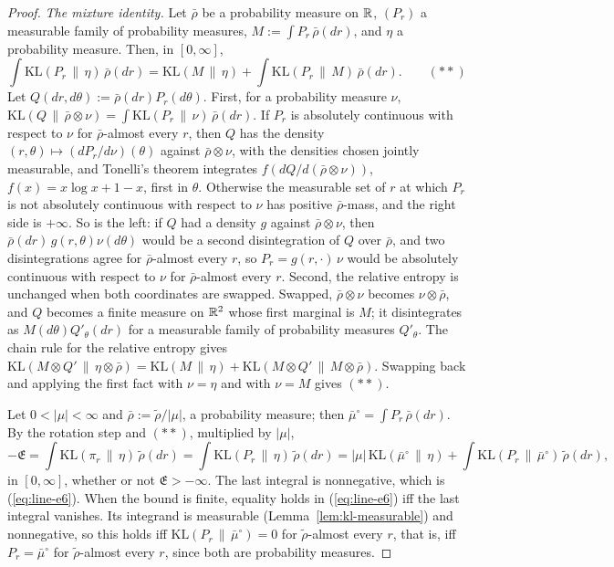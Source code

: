 \begin{proof}
\emph{The mixture identity.} Let $\bar\rho$ be a probability measure on $\mathbb{R}$, $(P_r)$ a measurable
family of probability measures, $M := \int P_r\,\bar\rho(dr)$, and $\eta$ a probability measure.
Then, in $[0,\infty]$,
\[
  \int\mathrm{KL}(P_r \,\|\, \eta)\,\bar\rho(dr)
  = \mathrm{KL}(M \,\|\, \eta) + \int\mathrm{KL}(P_r \,\|\, M)\,\bar\rho(dr). \qquad (**)
\]
Let $Q(dr, d\theta) := \bar\rho(dr)P_r(d\theta)$. First, for a probability measure $\nu$,
$\mathrm{KL}(Q \,\|\, \bar\rho \otimes \nu) = \int\mathrm{KL}(P_r \,\|\, \nu)\,\bar\rho(dr)$. If $P_r$
is absolutely continuous with respect to $\nu$ for $\bar\rho$-almost every $r$, then $Q$ has the
density $(r, \theta) \mapsto (dP_r/d\nu)(\theta)$ against $\bar\rho \otimes \nu$, with the densities
chosen jointly measurable, and Tonelli's theorem integrates $f(dQ/d(\bar\rho \otimes \nu))$,
$f(x) = x\log x + 1 - x$, first in $\theta$. Otherwise the measurable set of $r$ at which $P_r$ is
not absolutely continuous with respect to $\nu$ has positive $\bar\rho$-mass, and the right side is
$+\infty$. So is the left: if $Q$ had a density $g$ against $\bar\rho \otimes \nu$, then
$\bar\rho(dr)\,g(r, \theta)\nu(d\theta)$ would be a second disintegration of $Q$ over $\bar\rho$,
and two disintegrations agree for $\bar\rho$-almost every $r$, so $P_r = g(r, \cdot)\,\nu$ would be
absolutely continuous with respect to $\nu$ for $\bar\rho$-almost every $r$. Second, the relative entropy is
unchanged when both coordinates are swapped. Swapped, $\bar\rho \otimes \nu$ becomes
$\nu \otimes \bar\rho$, and $Q$ becomes a finite measure on $\mathbb{R}^2$ whose first marginal is $M$;
it disintegrates as $M(d\theta)Q'_\theta(dr)$ for a measurable family of probability measures
$Q'_\theta$. The chain rule for the relative entropy gives
$\mathrm{KL}(M \otimes Q' \,\|\, \eta \otimes \bar\rho)
= \mathrm{KL}(M \,\|\, \eta) + \mathrm{KL}(M \otimes Q' \,\|\, M \otimes \bar\rho)$. Swapping back and
applying the first fact with $\nu = \eta$ and with $\nu = M$ gives $(**)$.

Let $0 < |\mu| < \infty$ and $\bar\rho := \tilde\rho/|\mu|$, a probability measure; then
$\bar\mu^\circ = \int P_r\,\bar\rho(dr)$. By the rotation step and $(**)$, multiplied by $|\mu|$,
\[
  -\mathfrak{E} = \int\mathrm{KL}(\pi_r \,\|\, \eta)\,\tilde\rho(dr)
  = \int\mathrm{KL}(P_r \,\|\, \eta)\,\tilde\rho(dr)
  = |\mu|\,\mathrm{KL}(\bar\mu^\circ \,\|\, \eta) + \int\mathrm{KL}(P_r \,\|\, \bar\mu^\circ)\,\tilde\rho(dr),
\]
in $[0,\infty]$, whether or not $\mathfrak{E} > -\infty$. The last integral is nonnegative, which is
(\ref{eq:line-e6}). When the bound is finite, equality holds in (\ref{eq:line-e6}) iff the last integral vanishes. Its
integrand is measurable (Lemma~\ref{lem:kl-measurable}) and nonnegative, so this holds iff
$\mathrm{KL}(P_r \,\|\, \bar\mu^\circ) = 0$ for $\tilde\rho$-almost every $r$, that is, iff
$P_r = \bar\mu^\circ$ for $\tilde\rho$-almost every $r$, since both are probability measures.


\end{proof}
